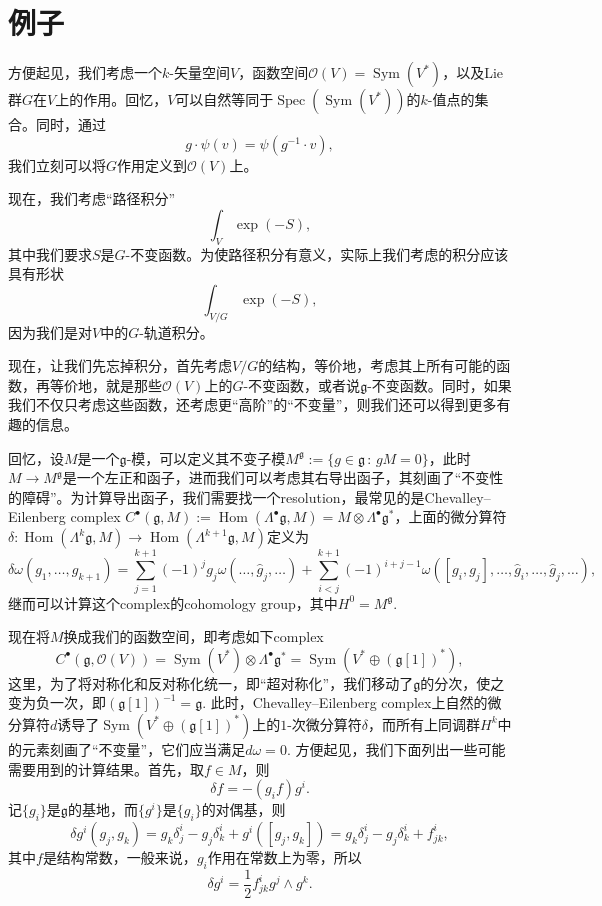 \documentclass[10pt]{article}
\theoremstyle{definition}
\theoremstyle{plain}
\begin{document}
\section{例子}

方便起见，我们考虑一个$k$-矢量空间$V$，函数空间$\mathscr O(V)=\operatorname{Sym}(V^*)$，以及Lie 群$G$在$V$上的作用。回忆，$V$可以自然等同于$\operatorname{Spec}(\operatorname{Sym}(V^*))$的$k$-值点的集合。同时，通过
\[
g\cdot\psi(v)=\psi(g^{-1}\cdot v),
\]
我们立刻可以将$G$作用定义到$\mathscr O(V)$上。

现在，我们考虑“路径积分”
\[
\int_{V} \exp(-S),
\]
其中我们要求$S$是$G$-不变函数。为使路径积分有意义，实际上我们考虑的积分应该具有形状
\[
\int_{V/G}\exp(-S),
\]
因为我们是对$V$中的$G$-轨道积分。

现在，让我们先忘掉积分，首先考虑$V/G$的结构，等价地，考虑其上所有可能的函数，再等价地，就是那些$\mathscr O(V)$上的$G$-不变函数，或者说$\mathfrak{g}$-不变函数。同时，如果我们不仅只考虑这些函数，还考虑更“高阶”的“不变量”，则我们还可以得到更多有趣的信息。

回忆，设$M$是一个$\mathfrak g$-模，可以定义其不变子模$M^{\mathfrak g}:=\{g \in \mathfrak g\,:\, gM=0\}$，此时$M\to M^{\mathfrak g}$是一个左正和函子，进而我们可以考虑其右导出函子，其刻画了“不变性的障碍”。为计算导出函子，我们需要找一个resolution，最常见的是Chevalley–Eilenberg complex $C^\bullet(\mathfrak g,M):=\operatorname{Hom}(\Lambda^\bullet \mathfrak g,M)=M\otimes \Lambda^\bullet \mathfrak g^*$，上面的微分算符$\delta:\operatorname{Hom}(\Lambda^k \mathfrak g,M)\to \operatorname{Hom}(\Lambda^{k+1} \mathfrak g,M)$定义为
\[
    \delta\omega(g_1,\dots,g_{k+1})=\sum_{j=1}^{k+1} (-1)^{j}g_j\omega(\dots,\hat{g}_j,\dots)+\sum_{i<j}^{k+1} (-1)^{i+j-1}\omega([g_i,g_j],\dots,\hat{g}_i,\dots,\hat{g}_j,\dots),
\]继而可以计算这个complex的cohomology group，其中$H^0=M^{\mathfrak g}$.

现在将$M$换成我们的函数空间，即考虑如下complex
\[
C^\bullet(\mathfrak g,\mathcal O(V))=\operatorname{Sym}(V^*)\otimes \Lambda^\bullet \mathfrak g^*
=\operatorname{Sym}(V^*\oplus (\mathfrak g[1])^*),
\]这里，为了将对称化和反对称化统一，即“超对称化”，我们移动了$\mathfrak g$的分次，使之变为负一次，即$(\mathfrak g[1])^{-1}=\mathfrak g$. 此时，Chevalley–Eilenberg complex上自然的微分算符$d$诱导了$\operatorname{Sym}(V^*\oplus (\mathfrak g[1])^*)$上的$1$-次微分算符$\delta$，而所有上同调群$H^k$中的元素刻画了“不变量”，它们应当满足$d\omega=0$. 方便起见，我们下面列出一些可能需要用到的计算结果。首先，取$f\in M$，则
\[
    \delta f=-(g_if)g^i.
\]
记$\{g_i\}$是$\mathfrak g$的基地，而$\{g^i\}$是$\{g_i\}$的对偶基，则
\[
    \delta g^i(g_j,g_k)=g_k\delta^i_j-g_j\delta^i_{k}+g^i([g_j,g_k])=g_k\delta^i_j-g_j\delta^i_{k}+f^i_{jk},
\]
其中$f$是结构常数，一般来说，$g_i$作用在常数上为零，所以
\[
    \delta g^i=\frac 12 f^i_{jk}g^j\wedge g^k.
\]
\end{document}
